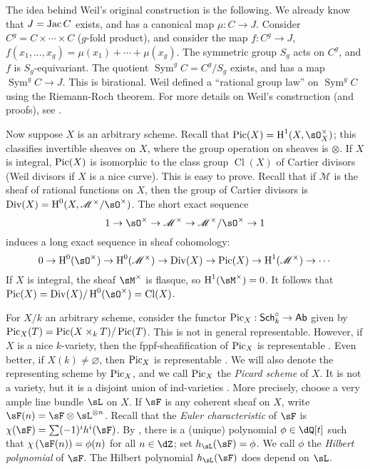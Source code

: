 The idea behind Weil's original construction is the following. We already 
know that $J=\operatorname{Jac} C$ exists, and has a canonical map $\mu:C\to J$. Consider 
$C^g=C\times\cdots\times C$ ($g$-fold product), and consider the map 
$f:C^g\to J$, $f(x_1,\dotsc,x_g)=\mu(x_1)+\cdots+\mu(x_g)$. The symmetric 
group $S_g$ acts on $C^g$, and $f$ is $S_g$-equivariant. The quotient 
$\operatorname{Sym}^g C = C^g/S_g$ exists, and has a map 
$\operatorname{Sym}^g C\to J$. This is birational. Weil defined a ``rational 
group law'' on $\operatorname{Sym}^g C$ using the Riemann-Roch theorem. For 
more details on Weil's construction (and proofs), see \cite[III.7]{mi-av}. 



Now suppose $X$ is an arbitrary scheme. Recall that 
$\picard(X)=\h^1(X,\sO_X^\times)$; this classifies invertible sheaves on 
$X$, where the group operation on sheaves is $\otimes$. If $X$ is integral, 
$\operatorname{Pic}(X)$ is isomorphic to the class group $\operatorname{Cl}(X)$ of Cartier 
divisors (Weil divisors if $X$ is a nice curve). This is easy to prove. Recall 
that if $\mathscr{M}$ is the sheaf of rational functions on $X$, then the 
group of Cartier divisors is $\divisor(X) = \h^0(X,\mathscr{M}^\times/\sO^\times)$. 
The short exact sequence 
\[
  1 \to \sO^\times \to \mathscr{M}^\times\to \mathscr{M}^\times/\sO^\times \to 1
\]
induces a long exact sequence in sheaf cohomology:
\[
  0 \to \h^0(\sO^\times) \to \h^0(\mathscr{M}^\times) \to \divisor(X) \to \picard(X) \to \h^1(\mathscr{M}^\times) \to \cdots
\]
If $X$ is integral, the sheaf $\sM^\times$ is flasque, so $\h^1(\sM^\times)=0$. 
It follows that 
$\picard(X)=\divisor(X)/\h^0(\sO^\times) = \operatorname{Cl}(X)$. 

For $X/k$ an arbitrary scheme, consider the functor 
$\operatorname{Pic}_X:\mathsf{Sch}_k^\circ\to\mathsf{Ab}$ given by 
$\operatorname{Pic}_X(T) = \operatorname{Pic}(X\times_k T)/\operatorname{Pic}(T)$. This is not in general 
representable. However, if $X$ is a nice $k$-variety, then the 
fppf-sheafification of $\operatorname{Pic}_X$ is representable \cite[4.1.38]{kl05}. Even 
better, if $X(k)\ne\varnothing$, then $\operatorname{Pic}_X$ is representable 
\cite[2.5]{kl05}. We will also denote the representing scheme by $\operatorname{Pic}_X$, and 
we call $\operatorname{Pic}_X$ the \emph{Picard scheme} of $X$. It is not a variety, but it 
is a disjoint union of ind-varieties \cite[4.8]{kl05}. More precisely, choose 
a very ample line bundle $\sL$ on $X$. If $\sF$ is any coherent 
sheaf on $X$, write 
$\sF(n) = \sF\otimes\sL^{\otimes n}$. Recall that the 
\emph{Euler characteristic} of $\sF$ is 
$\chi(\sF) = \sum (-1)^i h^i(\sF)$. By \cite[2.5.3]{gr61}, 
there is a (unique) polynomial $\phi\in \dQ[t]$ such that 
$\chi\left(\sF(n)\right) = \phi(n)$ for all 
$n\in\dZ$; set $h_\sL(\sF) = \phi$. We call $\phi$ the 
\emph{Hilbert polynomial} of $\sF$. The Hilbert polynomial 
$h_\sL(\sF)$ does depend on $\sL$.

